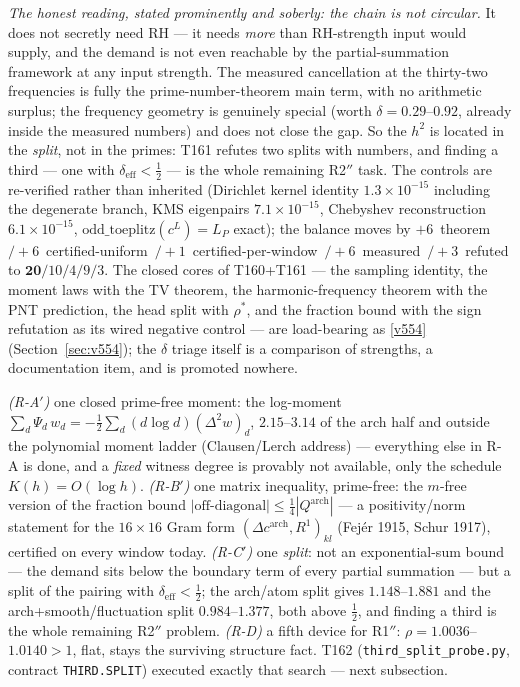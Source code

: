 \documentclass[11pt,a4paper]{article}
\begin{document}
\emph{The honest reading, stated prominently and soberly: the chain is not
circular.} It does not secretly need RH --- it needs \emph{more} than RH-strength
input would supply, and the demand is not even reachable by the partial-summation
framework at any input strength. The measured cancellation at the thirty-two
frequencies is fully the prime-number-theorem main term, with no arithmetic
surplus; the frequency geometry is genuinely special (worth $\delta=0.29$--$0.92$,
already inside the measured numbers) and does not close the gap. So the $h^2$ is
located in the \emph{split}, not in the primes: T161 refutes two splits with
numbers, and finding a third --- one with
$\delta_{\mathrm{eff}}<\tfrac12$ --- is the whole remaining R2$''$ task. The
controls are re-verified rather than inherited (Dirichlet kernel identity
$1.3\times10^{-15}$ including the degenerate branch, KMS eigenpairs
$7.1\times10^{-15}$, Chebyshev reconstruction $6.1\times10^{-15}$,
$\mathrm{odd\_toeplitz}(c^L)=L_P$ exact); the balance moves by
$+6$~theorem~$/+6$~certified-uniform~$/+1$~certified-per-window~$/+6$~measured~$/
+3$~refuted to $\mathbf{20}/10/4/9/3$. The closed cores of T160+T161 --- the
sampling identity, the moment laws with the TV theorem, the harmonic-frequency
theorem with the PNT prediction, the head split with $\rho^*$, and the fraction
bound with the sign refutation as its wired negative control --- are load-bearing
as \vref{v554} 
(Section~\ref{sec:v554}); the $\delta$ triage itself is a comparison of strengths,
a documentation item, and is promoted nowhere.

\begin{keybox}
\emph{(R-A$'$)} one closed prime-free moment: the log-moment
$\sum_d\Psi_d\,w_d=-\tfrac12\sum_d(d\log d)(\Delta^2w)_d$, $2.15$--$3.14$ of the
arch half and outside the polynomial moment ladder (Clausen/Lerch address) ---
everything else in R-A is done, and a \emph{fixed} witness degree is provably not
available, only the schedule $K(h)=O(\log h)$. \emph{(R-B$'$)} one matrix
inequality, prime-free: the $m$-free version of the fraction bound
$|\text{off-diagonal}|\le\tfrac14|Q^{\mathrm{arch}}|$ --- a positivity/norm
statement for the $16\times16$ Gram form $(\Delta c^{\mathrm{arch}},R^1)_{kl}$
(Fej\'er 1915, Schur 1917), certified on every window today. \emph{(R-C$'$)} one
\emph{split}: not an exponential-sum bound --- the demand sits below the boundary
term of every partial summation --- but a split of the pairing with
$\delta_{\mathrm{eff}}<\tfrac12$; the arch/atom split gives $1.148$--$1.881$ and
the arch+smooth/fluctuation split $0.984$--$1.377$, both above $\tfrac12$, and
finding a third is the whole remaining R2$''$ problem. \emph{(R-D)} a fifth device
for R1$''$: $\rho=1.0036$--$1.0140>1$, flat, stays the surviving structure fact.
T162 (\texttt{third\_split\_probe.py}, contract \texttt{THIRD.SPLIT}) executed
exactly that search --- next subsection.
\end{keybox}
\end{document}
